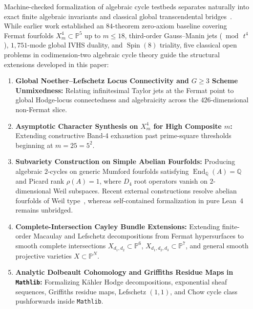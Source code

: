 \documentclass[11pt,a4paper]{article}
\begin{document}
Machine-checked formalization of algebraic cycle testbeds separates naturally into exact finite algebraic invariants and classical global transcendental bridges~\cite{Deligne2000,Shioda1979,Aoki1983}. While earlier work established an $84$-theorem zero-axiom baseline covering Fermat fourfolds $X_m^4 \subset \mathbb{P}^5$ up to $m \le 18$, third-order Gauss--Manin jets ($\bmod\, t^4$), $1{,}751$-mode global IVHS duality, and $\operatorname{Spin}(8)$ triality, five classical open problems in codimension-two algebraic cycle theory guide the structural extensions developed in this paper:
\begin{enumerate}
  \item[(i)] \textbf{Global Noether--Lefschetz Locus Connectivity and $G \ge 3$ Scheme Unmixedness:} Relating infinitesimal Taylor jets at the Fermat point to global Hodge-locus connectedness and algebraicity across the $426$-dimensional non-Fermat slice.
  \item[(ii)] \textbf{Asymptotic Character Synthesis on $X_m^4$ for High Composite $m$:} Extending constructive Band-4 exhaustion past prime-square thresholds beginning at $m = 25 = 5^2$.
  \item[(iii)] \textbf{Subvariety Construction on Simple Abelian Fourfolds:} Producing algebraic $2$-cycles on generic Mumford fourfolds satisfying $\operatorname{End}_{\mathbb{Q}}(A) = \mathbb{Q}$ and Picard rank $\rho(A) = 1$, where $D_4$ root operators vanish on $2$-dimensional Weil subspaces. Recent external constructions resolve abelian fourfolds of Weil type~\cite{Markman2025,FloccariFu2025}, whereas self-contained formalization in pure Lean~4 remains unbridged.
  \item[(iv)] \textbf{Complete-Intersection Cayley Bundle Extensions:} Extending finite-order Macaulay and Lefschetz decompositions from Fermat hypersurfaces to smooth complete intersections $X_{d_1,d_2} \subset \mathbb{P}^6$, $X_{d_1,d_2,d_3} \subset \mathbb{P}^7$, and general smooth projective varieties $X \subset \mathbb{P}^N$.
  \item[(v)] \textbf{Analytic Dolbeault Cohomology and Griffiths Residue Maps in \texttt{Mathlib}:} Formalizing K\"ahler Hodge decompositions, exponential sheaf sequences, Griffiths residue maps, Lefschetz $(1,1)$, and Chow cycle class pushforwards inside \texttt{Mathlib}.
\end{enumerate}
\end{document}
